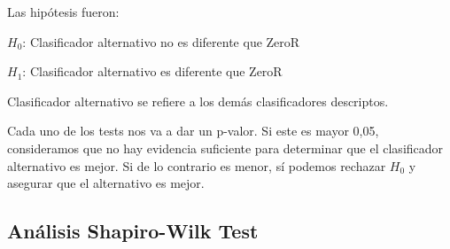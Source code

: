 %
%	

Las hipótesis fueron:

\vspace{0.5cm}
\hspace{2cm}$H_0$: Clasificador alternativo no es diferente que ZeroR
\vspace{0.25cm}

\hspace{2cm}$H_1$: Clasificador alternativo es diferente que ZeroR
\vspace{0.5cm}

Clasificador alternativo se refiere a los demás clasificadores descriptos. 

Cada uno de los tests nos va a dar un p-valor. Si este es mayor 0,05, consideramos que no hay evidencia suficiente para determinar que el clasificador alternativo es mejor. Si de lo contrario es menor, sí podemos rechazar $H_0$ y asegurar que el alternativo es mejor. 


\subsection{Análisis Shapiro-Wilk Test}

